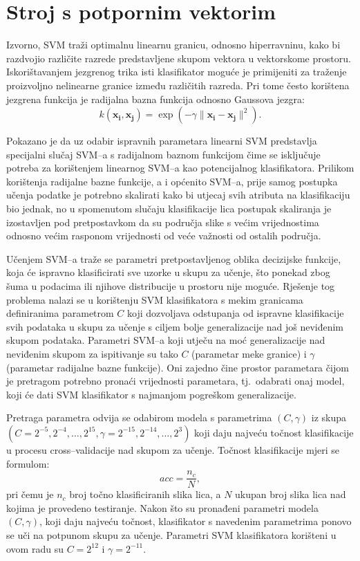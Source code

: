 \documentclass{ru}
\begin{document}
\section{Stroj s potpornim vektorim}
Izvorno, SVM traži optimalnu linearnu granicu, odnosno
hiperravninu, kako bi razdvojio različite razrede predstavljene skupom vektora u
vektorskome prostoru. Iskorištavanjem jezgrenog trika  isti
klasifikator moguće je primijeniti za traženje proizvoljno nelinearne granice
između različitih razreda. Pri tome često korištena jezgrena funkcija je
radijalna bazna funkcija odnosno Gaussova jezgra:
\begin{equation}
k(\mathbf{x_i},\mathbf{x_j})=\exp(-\gamma \|\mathbf{x_i} - \mathbf{x_j}\|^2).
\end{equation}

Pokazano je da uz odabir ispravnih parametara \citep{keerthi2003asymptotic} linearni SVM
predstavlja specijalni slučaj SVM--a s radijalnom baznom funkcijom čime
se isključuje potreba za korištenjem linearnog SVM--a kao potencijalnog
klasifikatora. Prilikom korištenja radijalne bazne funkcije, a i općenito
SVM--a, prije samog postupka učenja podatke je potrebno skalirati kako bi utjecaj svih
atributa na klasifikaciju bio jednak, no u spomenutom slučaju klasifikacije
lica postupak skaliranja je izostavljen pod pretpostavkom da su područja slike s
većim vrijednostima odnosno većim rasponom vrijednosti od veće važnosti od
ostalih područja. 

Učenjem SVM--a traže se parametri pretpostavljenog oblika decizijske funkcije,
koja će ispravno klasificirati sve uzorke u skupu za učenje, što ponekad zbog
šuma u podacima ili njihove distribucije u prostoru nije moguće. Rješenje tog
problema nalazi se u korištenju SVM klasifikatora s mekim granicama definiranima
parametrom $C$ koji dozvoljava odstupanja od ispravne klasifikacije svih podataka
u skupu za učenje s ciljem bolje generalizacije nad još neviđenim skupom
podataka. Parametri SVM--a koji utječu na moć generalizacije nad neviđenim skupom
za ispitivanje su tako $C$ (parametar meke granice) i $\gamma$ (parametar
radijalne bazne funkcije). Oni zajedno čine prostor parametara čijom je pretragom
potrebno pronaći vrijednosti parametara, tj.~odabrati onaj model, koji će dati
SVM klasifikator s najmanjom pogreškom generalizacije.

Pretraga parametra odvija se odabirom modela s parametrima $(C, \gamma)$ iz skupa
$\left (C = {2^{-5}, 2^{-4}, \ldots , 2^{15}},  \gamma = {2^{-15}, 2^{-14},
\ldots, 2^3} \right )$ \citep{CC01a} koji daju najveću točnost klasifikacije u
procesu cross--validacije nad skupom za učenje. Točnost klasifikacije mjeri se formulom:
\begin{equation}
acc = \frac{n_c}{N},
\end{equation}
pri čemu je $n_c$ broj točno klasificiranih slika lica, a $N$ ukupan broj slika
lica nad kojima je provedeno testiranje. Nakon što su pronađeni parametri modela $(C,
\gamma)$, koji daju najveću točnost, klasifikator s navedenim parametrima ponovo
se uči na potpunom skupu za učenje. Parametri SVM klasifikatora korišteni u ovom
radu su $C = 2^{12}$ i $\gamma = 2^{-11}$.
\end{document}
